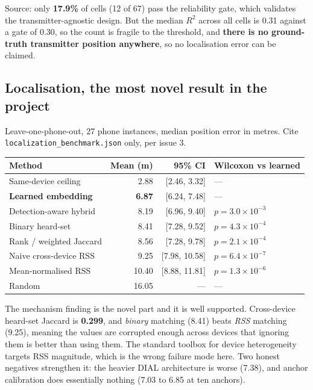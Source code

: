 \documentclass[10pt,a4paper]{article}
\newcommand{\B}[1]{\textcolor{bad}{\textbf{#1}}}
\newcommand{\G}[1]{\textcolor{good}{\textbf{#1}}}
\begin{document}
Source: only \G{17.9\%} of cells (12 of 67) pass the reliability gate, which validates
the transmitter-agnostic design. But the median $R^2$ across all cells is 0.31 against a
gate of 0.30, so the count is fragile to the threshold, and \B{there is no ground-truth
transmitter position anywhere}, so no localisation error can be claimed.

\subsection{Localisation, the most novel result in the project}

Leave-one-phone-out, 27 phone instances, median position error in metres. Cite
\texttt{localization\_benchmark.json} only, per issue 3.

\begin{center}\small
\begin{tabular}{@{}lrrl@{}}
\toprule
Method & Mean (m) & 95\% CI & Wilcoxon vs learned \\ \midrule
Same-device ceiling & 2.88 & [2.46, 3.32] & --- \\
\rowcolor{green!8}\textbf{Learned embedding} & \textbf{6.87} & [6.24, 7.48] & --- \\
Detection-aware hybrid & 8.19 & [6.96, 9.40] & $p=3.0\times10^{-3}$ \\
Binary heard-set & 8.41 & [7.28, 9.52] & $p=4.3\times10^{-4}$ \\
Rank / weighted Jaccard & 8.56 & [7.28, 9.78] & $p=2.1\times10^{-4}$ \\
Naive cross-device RSS & 9.25 & [7.98, 10.58] & $p=6.4\times10^{-7}$ \\
Mean-normalised RSS & 10.40 & [8.88, 11.81] & $p=1.3\times10^{-6}$ \\
Random & 16.05 & --- & --- \\
\bottomrule
\end{tabular}
\end{center}

The mechanism finding is the novel part and it is well supported. Cross-device heard-set
Jaccard is \G{0.299}, and \emph{binary} matching (8.41) beats \emph{RSS} matching (9.25),
meaning the values are corrupted enough across devices that ignoring them is better than
using them. The standard toolbox for device heterogeneity targets RSS magnitude, which is
the wrong failure mode here. Two honest negatives strengthen it: the heavier DIAL
architecture is worse (7.38), and anchor calibration does essentially nothing (7.03 to
6.85 at ten anchors).
\end{document}
